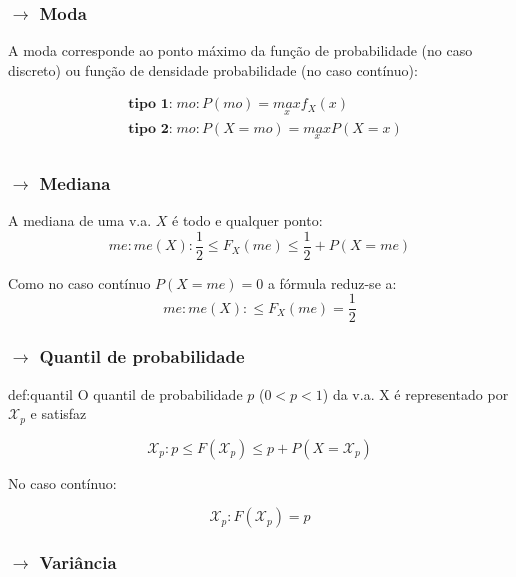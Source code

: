 \subsubsection[2.2.2 Moda]{$\pmb{\rightarrow}$ Moda}
\noindent A moda corresponde ao ponto máximo da função de probabilidade (no caso discreto) ou função de densidade probabilidade (no caso contínuo):

\begin{align*}
    &\textbf{tipo 1:}\; mo: P(mo) = \underset{x}{max} f_X(x)\\
    &\textbf{tipo 2:}\; mo: P(X = mo) = \underset{x}{max} P(X = x)\\
\end{align*}

\subsubsection[2.2.2 Mediana]{$\pmb{\rightarrow}$ Mediana}

{

\begin{mdframed}
    \noindent A mediana de uma v.a. $X$ é todo e qualquer ponto:
    $$
    me: me(X): \dfrac{1}{2} \leq F_X(me) \leq \dfrac{1}{2} + P(X = me)
    $$
    
    \noindent Como no caso contínuo $P(X = me) = 0$ a fórmula reduz-se a:
    $$
        me: me(X): \leq F_X(me) = \dfrac{1}{2}
    $$
\end{mdframed}
}

\subsubsection[2.2.2 Quantil de probabilidade]{$\pmb{\rightarrow}$ Quantil de probabilidade}
\begin{theo}{def:quantil}\label{def:quantil}
    O quantil de probabilidade $p$ ($0 < p < 1$) da v.a. X é representado por $\mathcal{X}_p$ e satisfaz

    $$
        \mathcal{X}_p: p \leq F(\mathcal{X}_p) \leq p + P(X = \mathcal{X}_p)
    $$

    No caso contínuo:

    $$
        \mathcal{X}_p: F(\mathcal{X}_p) = p 
    $$  
\end{theo}

\subsubsection[2.2.3 Variância]{$\pmb{\rightarrow}$ Variância}

